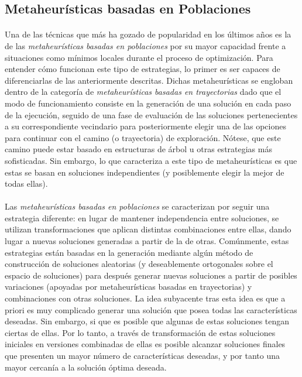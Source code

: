 \documentclass{subfiles}
\begin{document}
      \subsection{Metaheurísticas basadas en Poblaciones}
      \label{sec:solving_population_metaheuristics}

        \paragraph{}
        Una de las técnicas que más ha gozado de popularidad en los últimos años es la de las \emph{metaheurísticas basadas en poblaciones} por su mayor capacidad frente a situaciones como mínimos locales durante el proceso de optimización. Para entender cómo funcionan este tipo de estrategias, lo primer es ser capaces de diferenciarlas de las anteriormente descritas. Dichas metaheurísticas se engloban dentro de la categoría de \emph{metaheurísticas basadas en trayectorias} dado que el modo de funcionamiento consiste en la generación de una solución en cada paso de la ejecución, seguido de una fase de evaluación de las soluciones pertenecientes a su correspondiente vecindario para posteriormente elegir una de las opciones para continuar con el camino (o trayectoria) de exploración. Nótese, que este camino puede estar basado en estructuras de árbol u otras estrategias más sofisticadas. Sin embargo, lo que caracteriza a este tipo de metaheurísticas es que estas se basan en  soluciones independientes (y posiblemente elegir la mejor de todas ellas). 

      \paragraph{}
      Las \emph{metaheurísticas basadas en poblaciones} se caracterizan por seguir una estrategia diferente: en lugar de mantener independencia entre soluciones, se utilizan transformaciones que aplican distintas combinaciones entre ellas, dando lugar a nuevas soluciones generadas a partir de la  de otras. Comúnmente, estas estrategias están basadas en la generación mediante algún método de construcción de soluciones aleatorias (y deseablemente ortogonales sobre el espacio de soluciones) para después generar nuevas soluciones a partir de posibles variaciones (apoyadas por metaheurísticas basadas en trayectorias) y combinaciones con otras soluciones. La idea subyacente tras esta idea es que a priori es muy complicado generar una solución que posea todas las características deseadas. Sin embargo, si que es posible que algunas de estas soluciones tengan ciertas de ellas. Por lo tanto, a través de transformación de estas soluciones iniciales en versiones combinadas de ellas es posible alcanzar soluciones finales que presenten un mayor número de características deseadas, y por tanto una mayor cercanía a la solución óptima deseada.
\end{document}
